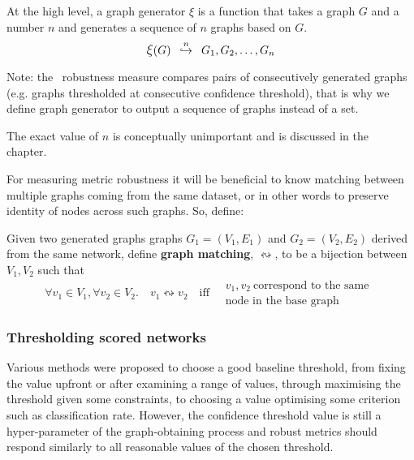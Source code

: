 At the high level, a graph generator $\xi$ is a function that takes a graph $G$ and a number $n$ and generates a sequence of $n$ graphs based on $G$.
\begin{equation}
    \mathlarger{\xi}(G) \generates{n} G_1, G_2, \dots, G_n
\end{equation}

Note: the~ robustness measure compares pairs of consecutively generated graphs (e.g. graphs thresholded at consecutive confidence threshold), that is why we define graph generator to output a sequence of graphs instead of a set.

The exact value of $n$ is conceptually unimportant and is discussed in the~ chapter.

\parspace

For measuring metric robustness it will be beneficial to know matching between multiple graphs coming from the same dataset, or in other words to preserve identity of nodes across such graphs.
So, define:

\begin{definition}
    \label{def:graph_matching}
    Given two generated graphs graphs $G_1 = (V_1, E_1)$ and $G_2 = (V_2, E_2)$ derived from the same network, define \textbf{graph matching}, $\leftrightsquigarrow$, to be a bijection between $V_1, V_2$ such that
    \begin{equation}
        \forall v_1 \in V_1, \forall v_2 \in V_2.\quad v_1 \leftrightsquigarrow v_2\quad\text{iff}\quad \begin{array}{l}
                                                                                                            v_1, v_2\ \text{correspond to the same }\\\text{node in the base graph}
        \end{array}
    \end{equation}
\end{definition}

\subsubsection{Thresholding scored networks}

Various methods were proposed to choose a good baseline threshold, from fixing the value upfront\cite{MeunierAgerelatedChangesModular2009} or after examining a range of values\cite{vanWijkComparingBrainNetworks2010,HorstmannStateDependentProperties2010}, through maximising the threshold given some constraints\cite{BassettAdaptiveReconfigurationFractal2006}, to choosing a value optimising some criterion such as classification rate\cite{ZaninOptimizingFunctionalNetwork2012}.
However, the confidence threshold value is still a hyper-parameter of the graph-obtaining process and robust metrics should respond similarly to all reasonable values of the chosen threshold.

